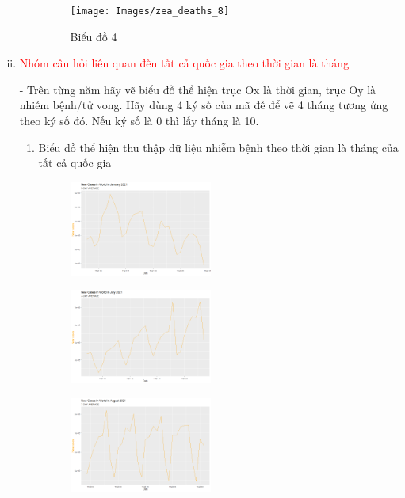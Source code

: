 \documentclass[a4paper]{article}
\theoremstyle{definition}
\begin{document}
\begin{enumerate}[i)]
\begin{enumerate}[1)]
		\begin{figure} [!htp]
  		\centering
  		\texttt{[image: Images/zea\_deaths\_8]}
  		\caption{Biểu đồ 4}
		\end{figure}
\end{enumerate}
	\item \textcolor{red}{Nhóm câu hỏi liên quan đến tất cả quốc gia theo thời gian là tháng }

- Trên từng năm hãy vẽ biểu đồ thể hiện trục Ox là thời gian, trục Oy là nhiễm bệnh/tử vong. Hãy dùng 4 ký số của mã đề để vẽ 4 tháng tương ứng theo ký số đó. Nếu ký số là 0 thì lấy tháng là 10. 
\begin{enumerate}[1]
    \item Biểu đồ thể hiện thu thập dữ liệu nhiễm bệnh theo thời gian là tháng của tất cả quốc gia\\
		\begin{figure} [!htp]
  		\centering
  		\includegraphics [width=0.47\textwidth] {Images/wrl_ncases_8}
		\end{figure}
		
		\begin{figure} [!htp]
  		\centering
  		\includegraphics [width=0.47\textwidth] {Images/wrl_ncases_6}
		\end{figure}
		
		\begin{figure} [!htp]
  		\centering
  		\includegraphics [width=0.47\textwidth] {Images/wrl_ncases_4}
		\end{figure}
		

\end{enumerate}
\end{enumerate}
\end{document}
